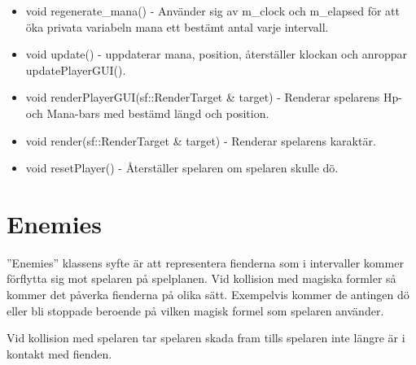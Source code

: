 \documentclass[12pt]{TDP005mall}
\begin{document}
\begin{itemize}
    \item void regenerate\_mana() - Använder sig av m\_clock och m\_elapsed för att öka privata variabeln mana ett bestämt antal varje intervall.
    
    \item void update() - uppdaterar mana, position, återställer klockan och anroppar updatePlayerGUI().
    
    \item void renderPlayerGUI(sf::RenderTarget \& target) - Renderar spelarens Hp- och Mana-bars med bestämd längd och position.
    
    \item void render(sf::RenderTarget \& target) - Renderar spelarens karaktär.
    
    \item void resetPlayer() - Återställer spelaren om spelaren skulle dö.

    
    
\end{itemize}
\clearpage


\section{Enemies}
''Enemies'' klassens syfte är att representera fienderna som i intervaller kommer förflytta sig mot spelaren på spelplanen. Vid kollision med magiska formler så kommer det påverka fienderna på olika sätt. Exempelvis kommer de antingen dö eller bli stoppade beroende på vilken magisk formel som spelaren använder.

Vid kollision med spelaren tar spelaren skada fram tills spelaren inte längre är i kontakt med fienden. 
\subsection{}
\end{document}

